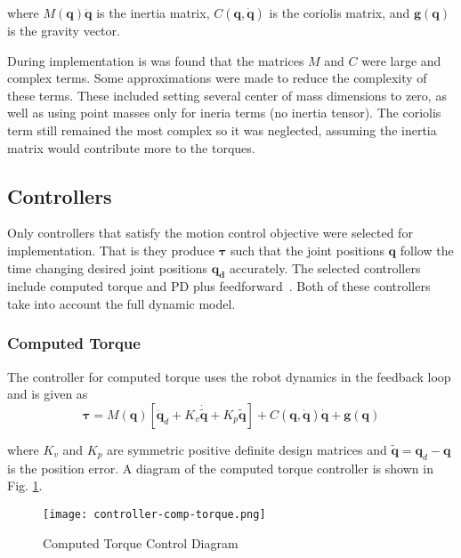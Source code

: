 \documentclass[conference]{IEEEtran}
\begin{document}
where $M(\boldsymbol{q})\ddot{\boldsymbol{q}}$ is the inertia matrix,
$C(\boldsymbol{q}, \dot{\boldsymbol{q}})$ is the coriolis matrix, and
$\boldsymbol{g}(\boldsymbol{q})$ is the gravity vector.

During implementation is was found that the matrices $M$ and $C$ were large and
complex terms. Some approximations were made to reduce the complexity of these
terms. These included setting several center of mass dimensions to zero, as well
as using point masses only for ineria terms (no inertia tensor). The
coriolis term still remained the most complex so it was neglected, assuming the
inertia matrix would contribute more to the torques.

\subsection{Controllers}
Only controllers that satisfy the motion control objective were selected for
implementation. That is they produce $\boldsymbol{\tau}$ such that the joint
positions $\boldsymbol{q}$ follow the time changing desired joint positions
$\boldsymbol{q_d}$ accurately. The selected controllers include computed torque
and PD plus feedforward~\cite{kelly2007control}. Both of these controllers take
into account the full dynamic model.

\subsubsection{Computed Torque}
The controller for computed torque uses the robot dynamics in the feedback loop
and is given as
\begin{equation*}
  \boldsymbol{\tau} = M(\boldsymbol{q}) \left [ \ddot{\boldsymbol{q}}_d + K_v \dot{\tilde{\boldsymbol{q}}} + K_p \tilde{\boldsymbol{q}} \right ] + C(\boldsymbol{q}, \dot{\boldsymbol{q}})\dot{\boldsymbol{q}} + \boldsymbol{g}(\boldsymbol{q})
\end{equation*}

where $K_v$ and $K_p$ are symmetric positive definite design matrices and
$\tilde{\boldsymbol{q}} = \boldsymbol{q}_d - \boldsymbol{q}$ is the position
error. A diagram of the computed torque controller is shown in
Fig. \ref{fig:comp-torque}.

\begin{figure}[!t]
  \texttt{[image: controller-comp-torque.png]}
  \caption{Computed Torque Control Diagram}
  \label{fig:comp-torque}
\end{figure}
\end{document}
